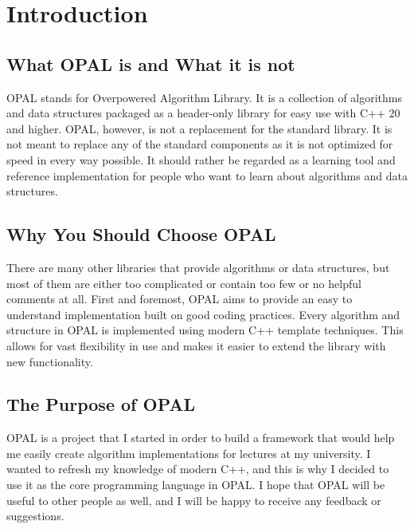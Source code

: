 \section{Introduction}

\subsection{What OPAL is and What it is not}

OPAL stands for Overpowered Algorithm Library. It is a collection of algorithms and data structures packaged as a header-only library for easy use with C++ 20 and higher. OPAL, however, is not a replacement for the standard library. It is not meant to replace any of the standard components as it is not optimized for speed in every way possible. It should rather be regarded as a learning tool and reference implementation for people who want to learn about algorithms and data structures.

\subsection{Why You Should Choose OPAL}

There are many other libraries that provide algorithms or data structures, but most of them are either too complicated or contain too few or no helpful comments at all. First and foremost, OPAL aims to provide an easy to understand implementation built on good coding practices. Every algorithm and structure in OPAL is implemented using modern C++ template techniques. This allows for vast flexibility in use and makes it easier to extend the library with new functionality.

\subsection{The Purpose of OPAL}

OPAL is a project that I started in order to build a framework that would help me easily create algorithm implementations for lectures at my university. I wanted to refresh my knowledge of modern C++, and this is why I decided to use it as the core programming language in OPAL. I hope that OPAL will be useful to other people as well, and I will be happy to receive any feedback or suggestions.
